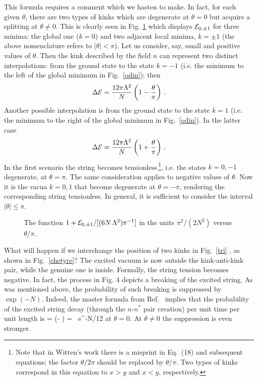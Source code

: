 This formula requires a comment which we hasten to make.
In fact, for each given $\theta$, there are two types of kinks
which are degenerate at $\theta =0$ but acquire a splitting at
$\theta  \neq 0$. This is clearly seen in Fig. \ref{3k}
which displays ${\cal E}_{0,\pm 1}$ for three minima:
the global one ($k=0$) and two adjacent local minima, $k= \pm 1$
(the above nomenclature refers to $ | \theta | <\pi$). 
Let us consider, say, small and positive values of $\theta$. 
Then the kink described by the field $n$
can represent two distinct interpolations:
from the ground state to the state $k=-1$
(i.e. the minimum to the left of the global minimum
in Fig.~\ref{odin}); then $$\Delta {\cal E} =
\frac{12 \pi\Lambda^2}{N} \left(1-\frac{\theta}{\pi}
\right)\,.$$  
Another possible interpolation is from the ground state to the state $k=1$
(i.e. the minimum to the right of the global minimum
in Fig.~\ref{odin}). In the latter case 
 $$\Delta {\cal E} =
\frac{12 \pi\Lambda^2}{N} \left(1+ \frac{\theta}{\pi}
\right)\,.$$  
In the first scenario the string becomes tensionless\,\footnote{Note 
that in Witten's work \cite{5} there is a misprint in Eq.~(18) and   
subsequent equations; the factor $\theta /2\pi $ should be replaced by
$\theta /\pi $. Two types of kinks correspond 
in this equation to $x >y$
and $x<y$, respectively.}, i.e. the states $k=0, -1$ degenerate,  at
$\theta = \pi$. The same consideration applies to negative values of
$\theta$.  Now it is the vacua $k=0,  1$ that become degenerate at
$\theta = -\pi$, rendering the corresponding string tensionless. 
In general, it
is sufficient to consider the interval $|\theta | \leq\pi$.

\begin{figure}
\epsfxsize=8cm
\centerline{}
\caption{
The function $1 + {\cal E}_{0, \pm 1}/[ (6 N\,  \Lambda^2 )\pi^{-1}]$
in the units $\pi^2/(2N^2)$ versus $\theta /\pi$.}
\label{3k}
\end{figure}

What will happen if we interchange the position of two kinks
in Fig.~\ref{tri} , as shown in Fig.~\ref{chetyre}? The excited vacuum is now outside
the kink-anti-kink pair, while the genuine one is inside.
Formally, the string tension becomes negative. In fact, the process
in Fig. 4 depicts a breaking of the excited string. As was mentioned
above, the probability of such breaking is suppressed by $\exp (-N)$.
Indeed, the master formula from Ref.~\cite{Volo} implies
that the probability of the excited string decay
(through the $n$-$n^*$ pair creation) per unit time per unit length is
\beq
\Gamma = \exp\left(-
\right) = \, e^{-N/12}
\eeq
at $\theta =0$. At $\theta \neq 0$ the suppression is even stronger.

